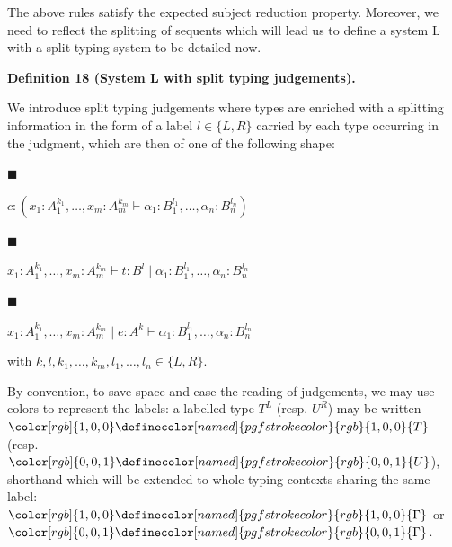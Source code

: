 The above rules satisfy the expected subject reduction property. Moreover, we need to reflect the splitting of sequents which will lead us to define a system L with a split typing system to be detailed now.\par
 
 
 
\par\medskip\noindent\textbf{Definition 18 (System L with split typing judgements).}\par
 
 
We introduce split typing judgements where types are enriched with a splitting information in the form of a label $l\in\{L,R\}$ carried by each type occurring in the judgment, which are then of one of the following shape:\par
  
\par\noindent  $\blacksquare$ 
 
$c:(x_{1}:A_{1}^{k_{1}},\dots,x_{m}:A_{m}^{k_{m}}\vdash\alpha_{1}:B_{1}^{l_{1}},\dots,\alpha_{n}:B_{n}^{l_{n}})$\par
 
 
 
\par\noindent  $\blacksquare$ 
 
$x_{1}:A_{1}^{k_{1}},\dots,x_{m}:A_{m}^{k_{m}}\vdash t:B^{l}\mid\alpha_{1}:B_{1}^{l_{1}},\dots,\alpha_{n}:B_{n}^{l_{n}}$\par
 
 
 
\par\noindent  $\blacksquare$ 
 
$x_{1}:A_{1}^{k_{1}},\dots,x_{m}:A_{m}^{k_{m}}\mid e:A^{k}\vdash\alpha_{1}:B_{1}^{l_{1}},\dots,\alpha_{n}:B_{n}^{l_{n}}$\par
 
 
  
with $k,l,k_{1},\dots,k_{m},l_{1},\dots,l_{n}\in\{L,R\}$.\par
 
 
 
By convention, to save space and ease the reading of judgements, we may use colors to represent the labels: a labelled type $T^{L}$ (resp. $U^{R}$) may be written ${\color[rgb]{1,0,0}\definecolor[named]{pgfstrokecolor}{rgb}{1,0,0}{{T}}}$ (resp. ${\color[rgb]{0,0,1}\definecolor[named]{pgfstrokecolor}{rgb}{0,0,1}{{U}}}$), shorthand which will be extended to whole typing contexts sharing the same label: ${\color[rgb]{1,0,0}\definecolor[named]{pgfstrokecolor}{rgb}{1,0,0}{{\Gamma}}}$ or ${\color[rgb]{0,0,1}\definecolor[named]{pgfstrokecolor}{rgb}{0,0,1}{{\Gamma}}}$.\par
 
